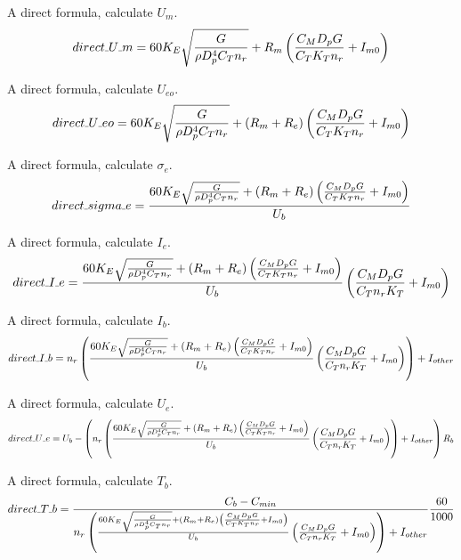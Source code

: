 \documentclass{article} %
\numberwithin{equation}{section} %
\newcommand{\SL}{\rule{.3em}{.3pt}} %
\begin{document}
A direct formula, calculate ${U_m}$.
\begin{equation}
direct\SL U\SL m = 60 K_{E}\sqrt{\frac {G} {\rho D_p^4 C_T n_r}} 
	+ R_m \left(\frac{C_M D_p G}{C_T K_T n_r} + {I_{m0}}\right) \label{q_hover.direct_U_m}
\end{equation}

A direct formula, calculate ${U_{eo}}$.
\begin{equation}
direct\SL U\SL eo = 60 K_{E}\sqrt{\frac {G} {\rho D_p^4 C_T n_r}} 
	+ (R_m + R_e) \left(\frac{C_M D_p G}{C_T K_T n_r} + {I_{m0}}\right)
	\label{q_hover.direct_U_eo}
\end{equation}

A direct formula, calculate ${\sigma_{e}}$.
\begin{equation}
direct\SL sigma\SL e = \frac{60 K_{E}\sqrt{\frac {G} {\rho D_p^4 C_T n_r}} 
	+ (R_m + R_e) \left(\frac{C_M D_p G}{C_T K_T n_r} + {I_{m0}}\right)}{U_b}
	\label{q_hover.direct_sigma_e}
\end{equation}

A direct formula, calculate ${I_{e}}$.
\begin{equation}
direct\SL I\SL e = \frac{60 K_{E}\sqrt{\frac {G} {\rho D_p^4 C_T n_r}} 
	+ (R_m + R_e) \left(\frac{C_M D_p G}{C_T K_T n_r}+ {I_{m0}}\right)}{U_b} 
	\left(\frac{C_M D_p G}{C_T n_r K_T} + {I_{m0}}\right)
	\label{q_hover.direct_I_e}
\end{equation}

A direct formula, calculate ${I_{b}}$.
\begin{equation}
direct\SL I\SL b = n_r \left(\frac{60 K_{E}\sqrt{\frac {G} {\rho D_p^4 C_T n_r}} 
	+ (R_m + R_e) \left(\frac{C_M D_p G}{C_T K_T n_r} + {I_{m0}}\right)}{U_b} 
	\left(\frac{C_M D_p G}{C_T n_r K_T} + {I_{m0}}\right)
	\right)
	+ I_{other}
	\label{q_hover.direct_I_b}
\end{equation}

A direct formula, calculate ${U_{e}}$.
\begin{equation}
direct\SL U\SL e = U_b - \left(n_r \left(\frac{60 K_{E}\sqrt{\frac {G} {\rho D_p^4 C_T n_r}} 
	+ (R_m + R_e) \left(\frac{C_M D_p G}{C_T K_T n_r} + {I_{m0}}\right)}{U_b} 
	\left(\frac{C_M D_p G}{C_T n_r K_T} + {I_{m0}}\right)  
	\right)
	+ I_{other}\right) R_b
	\label{q_hover.direct_U_e}
\end{equation}

A direct formula, calculate ${T_b}$.
\begin{equation}
direct\SL T\SL b = \frac{C_b - C_{min}}
	{n_r \left(\frac{60 K_{E}\sqrt{\frac {G} {\rho D_p^4 C_T n_r}} 
	+ (R_m + R_e) \left(\frac{C_M D_p G}{C_T K_T n_r} + {I_{m0}}\right)}{U_b} 
	\left(\frac{C_M D_p G}{C_T n_r K_T} + {I_{m0}}\right)
	\right)
	+ I_{other}} 
	\frac{60}{1000} \label{q_hover.direct_T_b}
\end{equation}
\end{document}
